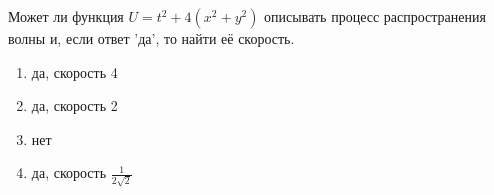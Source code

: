 Может ли функция \(U=t^2+4\left(x^2 + y^2\right)\) описывать процесс распространения волны и, если ответ 'да', то найти её скорость.

\begin{enumerate}[label=\arabic*)]
    \item да, скорость 4
    \item да, скорость 2
    \item нет
    \item да, скорость \(\frac{1}{2\sqrt{2}}\)
\end{enumerate}

